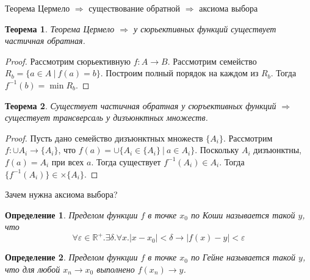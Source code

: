 \documentclass[aspectratio=169]{beamer}
\newtheorem{thm}{Теорема}[section]
\newtheorem{dfn}{Определение}[section]
\begin{document}
\begin{frame}{Теорема Цермело $\Rightarrow$ существование обратной $\Rightarrow$ аксиома выбора}
\begin{thm}Теорема Цермело $\Rightarrow$ у сюрьективных функций существует частичная обратная.\end{thm}
\begin{proof}
Рассмотрим сюрьективную $f: A \rightarrow B$. Рассмотрим семейство $R_b = \{ a \in A\ |\ f(a) = b \}$.
Построим полный порядок на каждом из $R_b$. Тогда $f^{-1}(b) = \min R_b$.
\end{proof}
\begin{thm}Существует частичная обратная у сюръективных функций $\Rightarrow$ существует трансверсаль у дизъюнктных множеств.\end{thm}
\begin{proof}
Пусть дано семейство дизъюнктных множеств $\{ A_i \}$. 
Рассмотрим $f: \cup A_i \rightarrow \{A_i\}$, что
$f(a) = \cup\{ A_i \in \{ A_i \}\ |\ a \in A_i \}$. Поскольку $A_i$ дизъюнктны,
$f(a) = A_i$ при всех $a$. Тогда существует $f^{-1}(A_i) \in A_i$. Тогда $\{ f^{-1}(A_i) \} \in \times \{A_i\}$.
\end{proof}
\end{frame}


\begin{frame}{Зачем нужна аксиома выбора?}
\begin{dfn}Пределом функции $f$ в точке $x_0$ по \emph{Коши} называется такой $y$, что
$$\forall \varepsilon\in\mathbb{R}^+.\exists \delta.\forall x.|x-x_0| < \delta \rightarrow |f(x) - y| < \varepsilon$$
\end{dfn}

\vspace{-0.5cm}
\begin{dfn}Пределом функции $f$ в точке $x_0$ по \emph{Гейне} называется такой $y$, что
для любой $x_n \rightarrow x_0$ выполнено $f(x_n) \rightarrow y$.
\end{dfn}
\end{frame}
\end{document}
